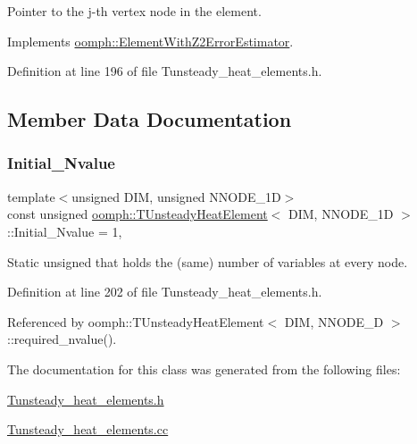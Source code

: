 Pointer to the j-\/th vertex node in the element. 



Implements \hyperlink{classoomph_1_1ElementWithZ2ErrorEstimator_a0eedccc33519f852c5dc2055ddf2774b}{oomph\+::\+Element\+With\+Z2\+Error\+Estimator}.



Definition at line 196 of file Tunsteady\+\_\+heat\+\_\+elements.\+h.



\subsection{Member Data Documentation}
\mbox{\label{classoomph_1_1TUnsteadyHeatElement_aba29bc3837ccd8a26538b4b6b0d87e53}} 
\subsubsection{\texorpdfstring{Initial\+\_\+\+Nvalue}{Initial\_Nvalue}}
{\footnotesize\ttfamily template$<$unsigned D\+IM, unsigned N\+N\+O\+D\+E\+\_\+1D$>$ \\
const unsigned \hyperlink{classoomph_1_1TUnsteadyHeatElement}{oomph\+::\+T\+Unsteady\+Heat\+Element}$<$ D\+IM, N\+N\+O\+D\+E\+\_\+1D $>$\+::Initial\+\_\+\+Nvalue = 1\hspace{0.3cm}{\ttfamily [static]}, {\ttfamily [private]}}



Static unsigned that holds the (same) number of variables at every node. 



Definition at line 202 of file Tunsteady\+\_\+heat\+\_\+elements.\+h.



Referenced by oomph\+::\+T\+Unsteady\+Heat\+Element$<$ D\+I\+M, N\+N\+O\+D\+E\+\_\+D $>$\+::required\+\_\+nvalue().



The documentation for this class was generated from the following files\+:\begin{DoxyCompactItemize}
\item 
\hyperlink{Tunsteady__heat__elements_8h}{Tunsteady\+\_\+heat\+\_\+elements.\+h}\item 
\hyperlink{Tunsteady__heat__elements_8cc}{Tunsteady\+\_\+heat\+\_\+elements.\+cc}\end{DoxyCompactItemize}
